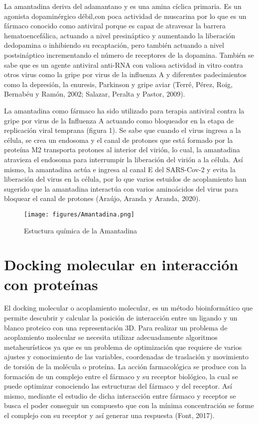 \documentclass[12pt]{article}
\begin{document}
La amantadina deriva del adamantano y es una amina cíclica primaria. Es un agonista dopaminérgico débil,con poca actividad de muscarina por lo que es un fármaco conocido como antiviral porque es capaz de atravesar la barrera hematoencefálica, actuando a nivel presináptico y aumentando la liberación dedopamina o inhibiendo su recaptación, pero también actuando a nivel  postsináptico  incrementando  el  número  de  receptores  de  la  dopamina. También se sabe que es un agente antiviral anti-RNA con valiosa actividad in vitro contra otros virus como la gripe por virus de la influenza A y diferentes padecimientos como la depresión, la enuresis,  Parkinson y gripe aviar (Terré, Pérez, Roig, Bernabéu y Ramón, 2002; Salazar, Peralta y Pastor, 2009). 

La amantadina como fármaco ha sido utilizado para terapia antiviral contra la gripe por virus de la Influenza A actuando como bloqueador en la etapa de replicación viral temprana (figura 1). Se sabe que cuando el virus ingresa a la célula, se crea un endosoma y el canal de protones que está formado por la proteína M2 transporta protones al interior del virión, lo cual, la amantadina atravieza el endosoma para interrumpir la liberación del virión a la célula. Así mismo, la amantadina actúa e ingresa al canal E del SARS-Cov-2 y evita la liberación del virus en la célula, por lo que varios estuidos de acoplamiento han sugerido que la amantadina interactúa con varios aminoácidos del virus para bloquear el canal de protones (Araújo, Aranda y Aranda, 2020).
	
	
\begin{figure}[!ht]
 \centering
 \texttt{[image: figures/Amantadina.png]}
 \caption{Estuctura química de la Amantadina}
 \label{fig:exemplo}
\end{figure}	

	\section{Docking molecular en interacción con proteínas}
	\label{sec:trab_relacionados}
	
El docking molecular o acoplamiento molecular, es un método bioinformático que permite descubrir y calcular la posición de interacción entre un ligando y un blanco proteico con una representación 3D. Para realizar un problema de acoplamiento molecular se necesita utilizar adecuadamente algoritmos metaheurísticos ya que es un problema de optimización que requiere de varios ajustes y conocimiento de las variables, coordenadas de traslación y movimiento de torsión de la molécula o proteína. La acción farmacológica se produce con la formación de un  complejo  entre  el  fármaco  y  su  receptor  biológico, la cual se  puede optimizar  conociendo  las  estructuras  del  fármaco  y  del  receptor. Así mismo, mediante el  estudio  de dicha interacción entre fármaco y receptor se busca el poder conseguir un compuesto que con la mínima concentración  se forme el   complejo  con  su  receptor  y así generar una respuesta (Font, 2017). 
\end{document}
